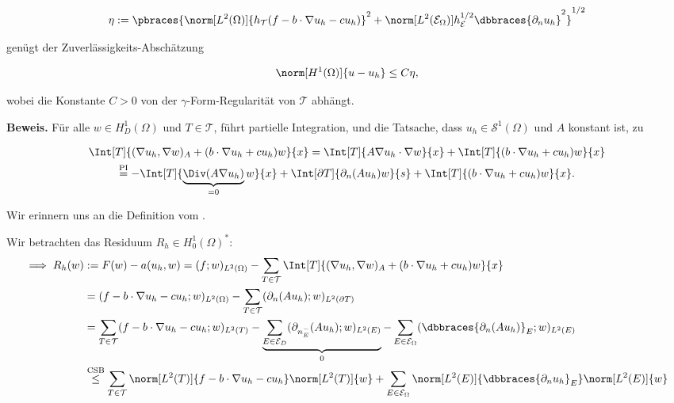 \begin{solution}
\begin{enumerate}[label = \textbf{\alph*)}]
\begin{tcolorbox}[standard jigsaw, opacityback = 0]
    \begin{align*}
      \eta
      :=
      \pbraces
      {
        \norm[L^2(\Omega)]{h_\mathcal{T} (f - b \cdot \nabla u_h - c u_h)}^2
        +
        \norm[L^2(\mathcal{E}_\Omega)]{h_\mathcal{E}^{1/2} \dbbraces{\partial_n u_h}}^2
      }^{1/2}
    \end{align*}

    genügt der Zuverlässigkeits-Abschätzung

    \begin{align*}
      \norm[H^1(\Omega)]{u - u_h}
      \leq
      C \eta,
    \end{align*}

    wobei die Konstante $C > 0$ von der $\gamma$-Form-Regularität von $\mathcal{T}$ abhängt.

  \end{tcolorbox}

  \textbf{Beweis.}
  Für alle $w \in H_D^1(\Omega)$ und $T \in \mathcal{T}$, führt partielle Integration, und die Tatsache, dass $u_h \in \mathcal{S}^1(\Omega)$ und $A$ konstant ist, zu

  \begin{multline*}
    \Int[T]{(\nabla u_h, \nabla w)_A + (b \cdot \nabla u_h + c u_h) w}{x}
    =
    \Int[T]{A \nabla u_h \cdot \nabla w}{x}
    +
    \Int[T]{(b \cdot \nabla u_h + c u_h) w}{x} \\
    \stackrel
    {
      \mathrm{PI}
    }{=}
    -\Int[T]
    {
      \underbrace
      {
        \Div(A \nabla u_h)
      }_{=0}
      w
    }{x}
    +
    \Int[\partial T]{\partial_n(A u_h) w}{s}
    +
    \Int[T]{(b \cdot \nabla u_h + c u_h) w}{x}.
  \end{multline*}

  Wir erinnern uns an die Definition vom .


  Wir betrachten das Residuum $R_h \in H_0^1(\Omega)^*$:
  \begin{align*}
    \implies
    R_h(w)
    & :=
    F(w) - a(u_h, w)
    =
    (f; w)_{L^2(\Omega)}
    -
    \sum_{T \in \mathcal{T}}
    \Int[T]{(\nabla u_h, \nabla w)_A + (b \cdot \nabla u_h + c u_h) w}{x} \\
    & =
    (f - b \cdot \nabla u_h - c u_h; w)_{L^2(\Omega)}
    -
    \sum_{T \in \mathcal{T}}
    (\partial_n (A u_h); w)_{L^2(\partial T)} \\
    & =
    \sum_{T \in \mathcal{T}}
    (f - b \cdot \nabla u_h - c u_h; w)_{L^2(T)}
    -
    \underbrace
    {
      \sum_{E \in \mathcal{E}_D}
      (\partial_{n_E^-} (A u_h); w)_{L^2(E)}
    }_0
    -
    \sum_{E \in \mathcal{E}_\Omega}
    (\dbbraces{\partial_n (A u_h)}_E; w)_{L^2(E)} \\
    & \stackrel
    {
      \mathrm{CSB}
    }{\leq}
    \sum_{T \in \mathcal{T}}
    \norm[L^2(T)]{f - b \cdot \nabla u_h - c u_h}
    \norm[L^2(T)]{w}
    +
    \sum_{E \in \mathcal{E}_\Omega}
    \norm[L^2(E)]{\dbbraces{\partial_n u_h}_E}
    \norm[L^2(E)]{w}
  \end{align*}


\end{enumerate}
\end{solution}
